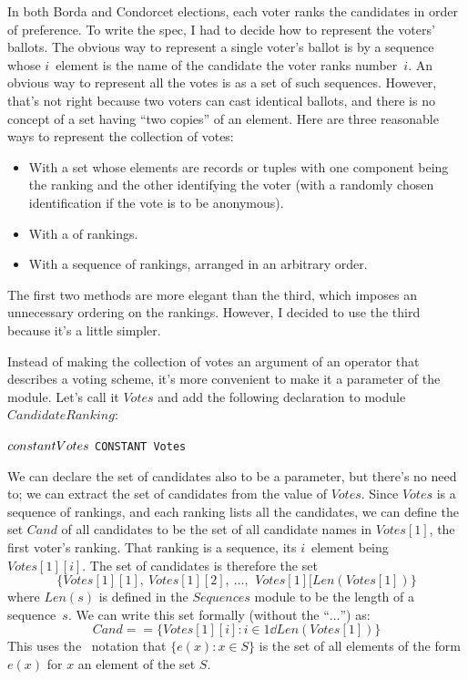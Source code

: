 \documentclass[fleqn,leqno]{article}
\begin{document}
In both Borda and Condorcet elections, each voter ranks the candidates
in order of preference.  To write the spec, I had to decide how to
represent the voters' ballots.  The obvious way to represent a single
voter's ballot is by a sequence whose $i$\tth\ element is the name of
the candidate the voter ranks number~$i$.  An obvious way to represent
all the votes is as a set of such sequences.  However, that's not
right because two voters can cast identical ballots, and there is no
concept of a set having ``two copies'' of an element.  Here are three
reasonable ways to represent the collection of votes:
\begin{itemize}
\item With a set whose elements are
records or tuples with one component being the ranking and the other
identifying the voter (with a randomly chosen identification if the
vote is to be anonymous).

\item With a 
 of rankings.

\item With a sequence of rankings, arranged in an arbitrary order.
\end{itemize}
The first two methods are more elegant than the third, which imposes
an unnecessary ordering on the rankings.  However, I decided to use the
third because it's a little simpler.  

Instead of making the collection of votes an argument of an operator
that describes a voting scheme, it's more convenient to make it a
parameter of the module.  Let's call it $Votes$ and add the following
declaration to module $CandidateRanking$:
\begin{twocols}
$\CONSTANT Votes$
\midcol
\verb|CONSTANT Votes|
\end{twocols}
We can declare the set of candidates also to be a parameter, but
there's no need to; we can extract the set of candidates from the
value of $Votes$.  Since $Votes$ is a sequence of rankings, and each
ranking lists all the candidates, we can define the set $Cand$
of all candidates to be the set of all candidate names in $Votes[1]$,
the first voter's ranking.  That ranking is a sequence, its $i$\tth\
element being $Votes[1][i]$.  The set of candidates is therefore the
set
 \[\{Votes[1][1],\ Votes[1][2],\ \ldots,\,\ Votes[1][Len(Votes[1])\} \]
where $Len(s)$ is defined in 
the $Sequences$ module to be the length of a sequence~$s$.
We can write this set formally (without the ``$\ldots$'') as:%
 \[ Cand == \{Votes[1][i] : i \in 1\dd Len(Votes[1])\} \]
This uses the \tlaplus\ notation that $\{e(x) : x \in S\}$
is the set of all elements of the form $e(x)$ for $x$ an element
of the set $S$.
\end{document}

